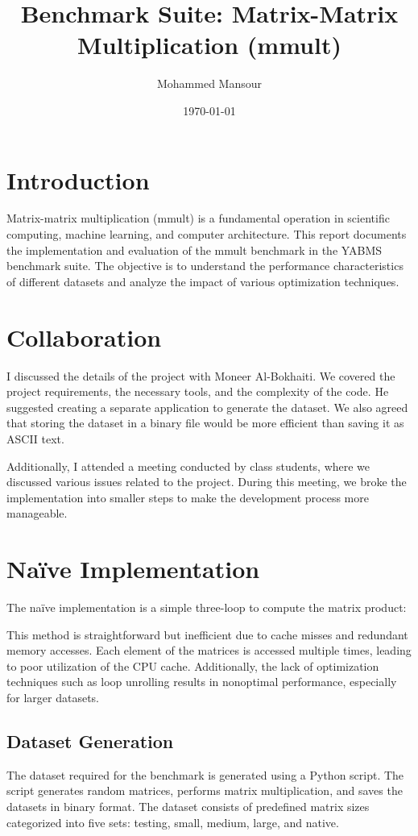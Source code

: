 \documentclass[12pt]{article}
\title{Benchmark Suite: Matrix-Matrix Multiplication (mmult)}
\author{Mohammed Mansour}
\date{\today}
\begin{document}
\maketitle

\section{Introduction}
Matrix-matrix multiplication (mmult) is a fundamental operation in scientific computing, machine learning, and computer architecture. This report documents the implementation and evaluation of the mmult benchmark in the YABMS benchmark suite. The objective is to understand the performance characteristics of different datasets and analyze the impact of various optimization techniques.

\section{Collaboration}
I discussed the details of the project with Moneer Al-Bokhaiti. We covered the project requirements, the necessary tools, and the complexity of the code. He suggested creating a separate application to generate the dataset. We also agreed that storing the dataset in a binary file would be more efficient than saving it as ASCII text.

Additionally, I attended a meeting conducted by class students, where we discussed various issues related to the project. During this meeting, we broke the implementation into smaller steps to make the development process more manageable.

\section{Naïve Implementation}
The naïve implementation is a simple three-loop to compute the matrix product:


This method is straightforward but inefficient due to cache misses and redundant memory accesses. Each element of the matrices is accessed multiple times, leading to poor utilization of the CPU cache. Additionally, the lack of optimization techniques such as loop unrolling results in nonoptimal performance, especially for larger datasets.

\subsection{Dataset Generation}
The dataset required for the benchmark is generated using a Python script. The script generates random matrices, performs matrix multiplication, and saves the datasets in binary format. The dataset consists of predefined matrix sizes categorized into five sets: testing, small, medium, large, and native.
\end{document}
